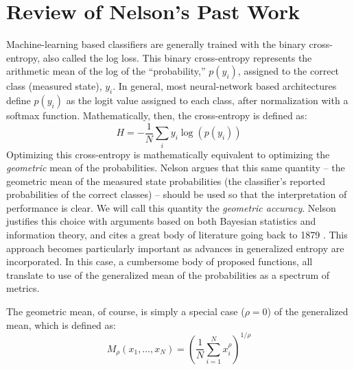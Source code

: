 \documentclass{spie}
\begin{document}
\section{Review of Nelson's Past Work}
\label{review}
Machine-learning based classifiers are generally trained with the binary cross-entropy, also called the log loss. This binary cross-entropy represents the arithmetic mean of the log of the ``probability,'' $p(y_i)$, assigned to the correct class (measured state), $y_i$. In general, most neural-network based architectures define $p(y_i)$ as the logit value assigned to each class, after normalization with a softmax function. Mathematically, then, the cross-entropy is defined as:
\begin{equation} H = -\frac{1}{N} \sum_i  y_i \log(p(y_i))  \end{equation}
Optimizing this cross-entropy is mathematically equivalent to optimizing the \textit{geometric} mean of the probabilities. Nelson argues that this same quantity -- the geometric mean of the measured state probabilities (the classifier's reported probabilities of the correct classes) -- should be used so that the interpretation of performance is clear. We will call this quantity the \textit{geometric accuracy}. Nelson justifies this choice with arguments based on both Bayesian statistics and information theory, and cites a great body of literature going back to 1879 \cite{McAlister}. This approach becomes particularly important as advances in generalized entropy are incorporated.  In this case, a cumbersome body of proposed functions, all translate to use of the generalized mean of the probabilities as a spectrum of metrics.

The geometric mean, of course, is simply a special case ($\rho = 0$) of the generalized mean, which is defined as:
\begin{equation} M_\rho(x_1, \ldots, x_N) = \left( \frac{1}{N} \sum_{i=1}^N x_i^\rho \right)^{1/\rho} \end{equation}
\end{document}
